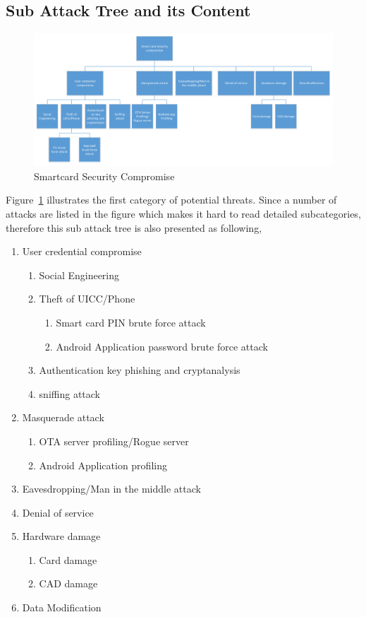 \subsection{Sub Attack Tree and its Content}
 \begin{figure}[!htb]
	\centering
	\includegraphics[width=1.2\textwidth]{attack-tree-smartcard}
		\caption{Smartcard Security Compromise}
	\label{fig:attack-tree-smartcard}
\end{figure}
Figure~\ref{fig:attack-tree-smartcard} illustrates the first category of potential threats. Since a number of attacks are listed in the figure which makes it hard to read detailed subcategories, therefore this sub attack tree is also presented as following,

\begin{enumerate}
	\item User credential compromise
  	\begin{enumerate}
    	\item Social Engineering
	\item Theft of UICC/Phone
		\begin{enumerate}
		\item Smart card PIN brute force attack
		\item Android Application password brute force attack
		\end{enumerate}
    	\item Authentication key phishing and cryptanalysis
    	\item  sniffing attack
	\end{enumerate}
	\item Masquerade attack
		\begin{enumerate}
		\item OTA server profiling/Rogue server
		\item Android Application profiling
		\end{enumerate}
	\item Eavesdropping/Man in the middle attack
	\item Denial of service
	\item Hardware damage
		\begin{enumerate}
		\item Card  damage
		\item CAD damage
		\end{enumerate}
	\item  Data Modification
\end{enumerate}

